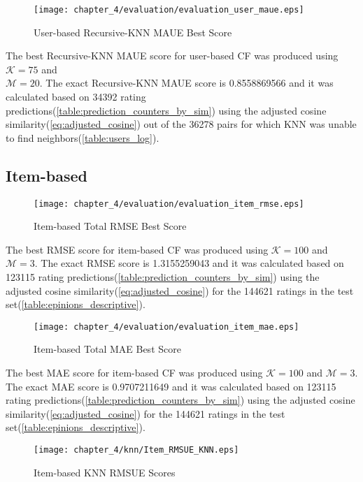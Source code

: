 \begin{figure}[H]
\centering
\texttt{[image: chapter\_4/evaluation/evaluation\_user\_maue.eps]}
\caption{User-based Recursive-KNN MAUE Best Score}
\label{figure:User_rknn_maue}
\end{figure}

The best Recursive-KNN MAUE score for user-based CF was produced using $\mathcal{K}=75$ and \\$\mathcal{M}=20$.
The exact Recursive-KNN MAUE score is 0.8558869566 and it was calculated based on 34392 rating predictions(\autoref{table:prediction_counters_by_sim})
using the adjusted cosine similarity(\autoref{eq:adjusted_cosine})
out of the 36278 pairs for which KNN was unable to find neighbors(\autoref{table:users_log}).

\subsection{Item-based}
\begin{figure}[H]
\centering
\texttt{[image: chapter\_4/evaluation/evaluation\_item\_rmse.eps]}
\caption{Item-based Total RMSE Best Score}
\label{figure:Item_knn_rmse}
\end{figure}

The best RMSE score for item-based CF was produced using $\mathcal{K}=100$ and $\mathcal{M}=3$.
The exact RMSE score is 1.3155259043 and it was calculated based on 123115 rating predictions(\autoref{table:prediction_counters_by_sim})
using the adjusted cosine similarity(\autoref{eq:adjusted_cosine})
for the 144621 ratings in the test set(\autoref{table:epinions_descriptive}).

\begin{figure}[H]
\centering
\texttt{[image: chapter\_4/evaluation/evaluation\_item\_mae.eps]}
\caption{Item-based Total MAE Best Score}
\label{figure:Item_knn_mae}
\end{figure}

The best MAE score for item-based CF was produced using $\mathcal{K}=100$ and $\mathcal{M}=3$.
The exact MAE score is 0.9707211649 and it was calculated based on 123115 rating predictions(\autoref{table:prediction_counters_by_sim})
using the adjusted cosine similarity(\autoref{eq:adjusted_cosine})
for the 144621 ratings in the test set(\autoref{table:epinions_descriptive}).

\begin{figure}[H]
\centering
\texttt{[image: chapter\_4/knn/Item\_RMSUE\_KNN.eps]}
\caption{Item-based KNN RMSUE Scores}
\label{figure:Item_knn_rmsue}
\end{figure}

